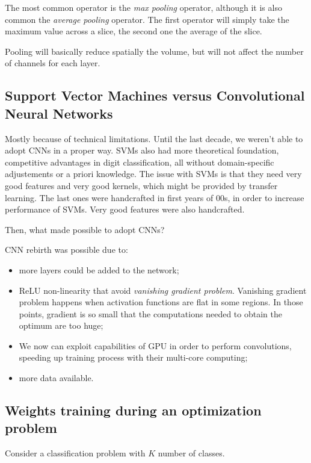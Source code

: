 \documentclass[10pt]{report}
\begin{document}
The most common operator is the \emph{max pooling} operator, although it is also common the \emph{average pooling} operator. The first operator will simply take the maximum value across a slice, the second one the average of the slice.

Pooling will basically reduce spatially the volume, but will not affect
the number of channels for each layer.

\subsection{Support Vector Machines versus Convolutional Neural Networks}
\label{support-vector-machines-versus-convolutional-neural-networks}
Mostly because of technical limitations. Until the last decade, we
weren't able to adopt CNNs in a proper way. SVMs also had more
theoretical foundation, competitive advantages in digit classification,
all without domain-specific adjustements or a priori knowledge. The
issue with SVMs is that they need very good features and very good
kernels, which might be provided by transfer learning. The last ones were handcrafted in first years of 00s, in order to increase performance of SVMs. Very good features were also handcrafted.

Then, what made possible to adopt CNNs?

CNN rebirth was possible due to:

\begin{itemize}
\item more layers could be added to the network;
\item ReLU non-linearity that avoid \emph{vanishing gradient problem}. Vanishing
gradient problem happens when activation functions are flat in some
regions. In those points, gradient is so small that the computations
needed to obtain the optimum are too huge;
\item We now can exploit capabilities of GPU in order to perform
convolutions, speeding up training process with their multi-core
computing;
\item more data available.
\end{itemize}

\subsection{Weights training during an optimization problem}
\label{weights-training-during-an-optimization-problem}
Consider a classification problem with \(K\) number of classes.
\end{document}
